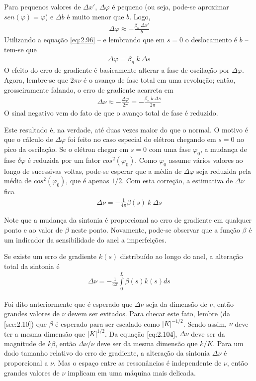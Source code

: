 Para pequenos valores de $\Delta x'$, $\Delta \varphi$ é pequeno (ou seja, pode-se aproximar $sen(\varphi) = \varphi$) e $\Delta b$ é muito menor que $b$. Logo,
\begin{align}
	\Delta \varphi \approx -\frac{\beta_n\ \Delta x'}{b}
\end{align}
Utilizando a equação \eqref{eq:2.96} -- e lembrando que em $s=0$ o deslocamento é $b$ -- tem-se que
\begin{align*}
	\Delta \varphi = \beta_n\ k\ \Delta s
\end{align*}
O efeito do erro de gradiente é basicamente alterar a fase de oscilação por $\Delta \varphi$. Agora, lembre-se que $2\pi\nu$ é o avanço de fase total em uma revolução; então, grosseiramente falando, o erro de gradiente acarreta em
\begin{align}
	\Delta \nu \approx - \frac{\Delta \varphi}{2\pi} = -\frac{\beta_n\ k\ \Delta s}{2\pi}
\end{align}
O sinal negativo vem do fato de que o avanço total de fase é reduzido.

Este resultado é, na verdade, até duas vezes maior do que o normal. O motivo é que o cálculo de $\Delta \varphi$ foi feito no caso especial do elétron chegando em $s=0$ no pico da oscilação. Se o elétron chegar em $s=0$ com uma fase $\varphi_0$, a mudança de fase $\delta \varphi$ é reduzida por um fator $cos^2(\varphi_0)$. Como $\varphi_0$ assume vários valores ao longo de sucessivas voltas, pode-se esperar que a média de $\Delta \varphi$ seja reduzida pela média de $cos^2(\varphi_0)$, que é apenas $1/2$. Com esta correção, a estimativa de $\Delta \nu$ fica
\begin{align}
	\Delta \nu = -\frac{1}{4\pi}\beta(s)\ k\ \Delta s
\end{align}

Note que a mudança da sintonia é proporcional ao erro de gradiente em qualquer ponto e ao valor de $\beta$ neste ponto. Novamente, pode-se observar que a função $\beta$ é um indicador da sensibilidade do anel a imperfeições.

Se existe um erro de gradiente $k(s)$ distribuído ao longo do anel, a alteração total da sintonia é
\begin{align}
	\Delta \nu = -\frac{1}{4\pi} \int\limits_{0}^{L}\beta(s)k(s)ds\label{eq:2.104}
\end{align}

Foi dito anteriormente que é esperado que $\Delta \nu$ seja da dimensão de $\nu$, então grandes valores de $\nu$ devem ser evitados. Para checar este fato, lembre (da \autoref{sec:2.10}) que $\beta$ é esperado para ser escalado como $|K|^{-1/2}$. Sendo assim, $\nu$ deve ter a mesma dimensão que $|K|^{1/2}$. Da equação \eqref{eq:2.104}, $\Delta \nu$ deve ser da magnitude de $k\beta$, então $\Delta \nu/\nu$ deve ser da mesma dimensão que $k/K$. Para um dado tamanho relativo do erro de gradiente, a alteração da sintonia $\Delta \nu$ é proporcional a $\nu$. Mas o espaço entre as ressonâncias é independente de $\nu$, então grandes valores de $\nu$ implicam em uma máquina mais delicada.

